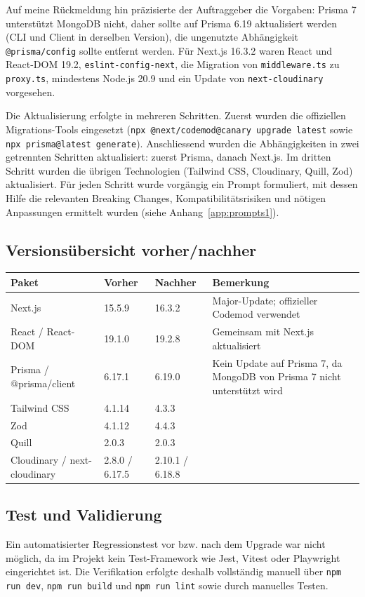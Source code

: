 \documentclass[11pt,a4paper]{article}
\let\oldsubsection\subsection
\renewcommand{\subsection}{\needspace{6\baselineskip}\oldsubsection}
\begin{document}
Auf meine Rückmeldung hin präzisierte der Auftraggeber die Vorgaben: Prisma 7 unterstützt MongoDB nicht, daher sollte auf Prisma 6.19 aktualisiert werden (CLI und Client in derselben Version), die ungenutzte Abhängigkeit \texttt{@prisma/config} sollte entfernt werden. Für Next.js 16.3.2 waren React und React-DOM 19.2, \texttt{eslint-config-next}, die Migration von \texttt{middleware.ts} zu \texttt{proxy.ts}, mindestens Node.js 20.9 und ein Update von \texttt{next-cloudinary} vorgesehen.

Die Aktualisierung erfolgte in mehreren Schritten. Zuerst wurden die offiziellen Migrations-Tools eingesetzt (\texttt{npx @next/codemod@canary upgrade latest} sowie \texttt{npx prisma@latest generate}). Anschliessend wurden die Abhängigkeiten in zwei getrennten Schritten aktualisiert: zuerst Prisma, danach Next.js. Im dritten Schritt wurden die übrigen Technologien (Tailwind CSS, Cloudinary, Quill, Zod) aktualisiert. Für jeden Schritt wurde vorgängig ein Prompt formuliert, mit dessen Hilfe die relevanten Breaking Changes, Kompatibilitätsrisiken und nötigen Anpassungen ermittelt wurden (siehe Anhang~\ref{app:prompts1}).

\subsection{Versionsübersicht vorher/nachher}
\begin{center}
\begin{tabularx}{\textwidth}{l l l X}
\toprule
\textbf{Paket} & \textbf{Vorher} & \textbf{Nachher} & \textbf{Bemerkung} \\
\midrule
Next.js & 15.5.9 & 16.3.2 & Major-Update; offizieller Codemod verwendet \\
React / React-DOM & 19.1.0 & 19.2.8 & Gemeinsam mit Next.js aktualisiert \\
Prisma / @prisma/client & 6.17.1 & 6.19.0 & Kein Update auf Prisma 7, da MongoDB von Prisma 7 nicht unterstützt wird \\
Tailwind CSS & 4.1.14 & 4.3.3 & \\
Zod & 4.1.12 & 4.4.3 & \\
Quill & 2.0.3 & 2.0.3 & \\
Cloudinary / next-cloudinary & 2.8.0 / 6.17.5 & 2.10.1 / 6.18.8 & \\
\bottomrule
\end{tabularx}
\end{center}

\subsection{Test und Validierung}
Ein automatisierter Regressionstest vor bzw. nach dem Upgrade war nicht möglich, da im Projekt kein Test-Framework wie Jest, Vitest oder Playwright eingerichtet ist. Die Verifikation erfolgte deshalb vollständig manuell über \texttt{npm run dev}, \texttt{npm run build} und \texttt{npm run lint} sowie durch manuelles Testen.
\end{document}
